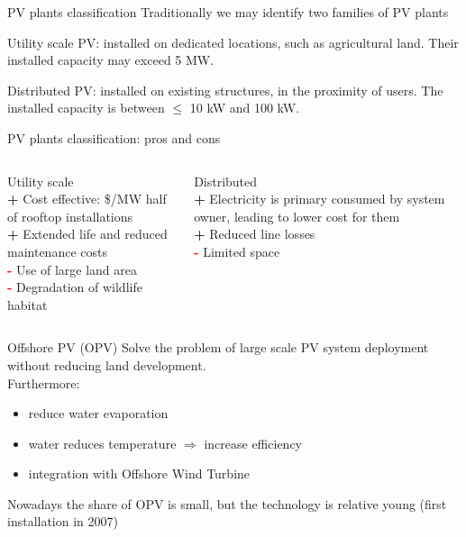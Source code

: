 \documentclass[aspectratio=169, 12pt]{beamer}
\begin{document}
\begin{frame}{PV plants classification}{\insertsubsection}
  Traditionally we may identify two families of PV plants

  \textcolor{NTNUBlue}{Utility scale PV}: installed on dedicated locations, such as agricultural land. Their installed capacity may exceed 5 MW.

  \textcolor{NTNUBlue}{Distributed PV}: installed on existing structures, in the proximity of users. The installed capacity is between $\le$ 10 kW and 100 kW.

\end{frame}

\begin{frame}{PV plants classification: pros and cons}{\insertsubsection}
  \begin{columns}
    \begin{column}{0.5\columnwidth}
      {\center \textcolor{NTNUBlue}{Utility scale}}\\
      \textcolor{NTNUgreen}{\textbf{+}} Cost effective: \$/MW half of rooftop installations\\
      \textcolor{NTNUgreen}{\textbf{+}} Extended life and reduced maintenance costs\\
      \textcolor{red}{\textbf{-}} Use of large land area\\
      \textcolor{red}{\textbf{-}} Degradation of wildlife habitat
    \end{column}
    \begin{column}{0.5\columnwidth}
      {\center \textcolor{NTNUBlue}{Distributed}}\\
      \textcolor{NTNUgreen}{\textbf{+}} Electricity is primary consumed by system owner, leading to lower cost for them\\
      \textcolor{NTNUgreen}{\textbf{+}} Reduced line losses\\
      \textcolor{red}{\textbf{-}} Limited space
    \end{column}
  \end{columns}
\end{frame}

\begin{frame}{Offshore PV (OPV)}{\insertsubsection}
  Solve the problem of large scale PV system deployment without reducing land development. \\
  Furthermore: 
  \begin{itemize}
    \item reduce water evaporation
    \item water reduces temperature $\Rightarrow$ increase efficiency
    \item integration with Offshore Wind Turbine
  \end{itemize} 

  Nowadays the share of OPV is small, but the technology is relative young (first installation in 2007)
\end{frame}
\end{document}
